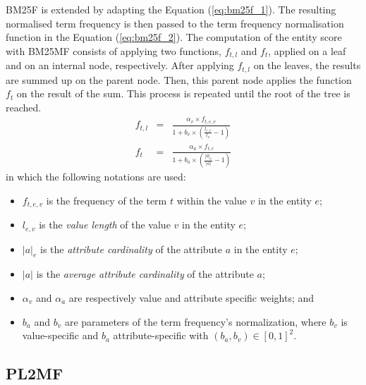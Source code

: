 BM25F is extended by adapting the Equation (\ref{eq:bm25f_1}). The resulting normalised term frequency is then passed to the term frequency normalisation function in the Equation (\ref{eq:bm25f_2}).
The computation of the entity score with BM25MF consists of applying two functions, $f_{t,l}$ and $f_t$, applied on a leaf and on an internal node, respectively. After applying $f_{t,l}$ on the leaves, the results are summed up on the parent node. Then, this parent node applies the function $f_t$ on the result of the sum. This process is repeated until the root of the tree is reached.
\begin{align}
\label{bm25mf_v}
f_{t,l} & = & \frac{\alpha_v\times f_{t,e,v}}{1+b_v\times\left(\frac{l_{e,v}}{l_a}-1\right)}\\
\label{bm25mf_a}
f_{t} & = & \frac{\alpha_a\times f_{t,c}}{1+b_a\times\left(\frac{\left|{a}\right|_e}{\left|{a}\right|}-1\right)}
\end{align}
in which the following notations are used:
\begin{itemize}
\item $f_{t,e,v}$ is the frequency of the term $t$ within the value $v$ in the entity $e$;
\item $l_{e,v}$ is the \emph{value length} of the value $v$ in the entity $e$;
\item $\left|{a}\right|_e$ is the \emph{attribute cardinality} of the attribute $a$ in the entity $e$;
\item $\left|{a}\right|$ is the \emph{average attribute cardinality} of the attribute $a$;
\item $\alpha_v$ and $\alpha_a$ are respectively value and attribute specific weights; and
\item $b_a$ and $b_v$ are parameters of the term frequency's normalization, where $b_v$ is value-specific and $b_a$ attribute-specific with $(b_a,b_v)\in\left[0,1\right]^2$.
\end{itemize}

\subsection{PL2MF}

